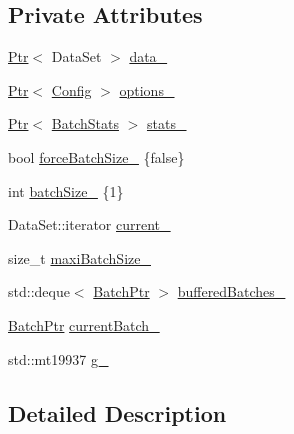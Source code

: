 \subsection*{Private Attributes}
\begin{DoxyCompactItemize}
\item 
\hyperlink{namespacemarian_ad1a373be43a00ef9ce35666145137b08}{Ptr}$<$ Data\+Set $>$ \hyperlink{classmarian_1_1data_1_1BatchGenerator_a1605c2a706f55cf89272cd19e2f98cf0}{data\+\_\+}
\item 
\hyperlink{namespacemarian_ad1a373be43a00ef9ce35666145137b08}{Ptr}$<$ \hyperlink{classmarian_1_1Config}{Config} $>$ \hyperlink{classmarian_1_1data_1_1BatchGenerator_a8569748b3bca0d5f30e6e2f4def1b535}{options\+\_\+}
\item 
\hyperlink{namespacemarian_ad1a373be43a00ef9ce35666145137b08}{Ptr}$<$ \hyperlink{classmarian_1_1data_1_1BatchStats}{Batch\+Stats} $>$ \hyperlink{classmarian_1_1data_1_1BatchGenerator_ac951bf49ac81aa01d834391dc1579096}{stats\+\_\+}
\item 
bool \hyperlink{classmarian_1_1data_1_1BatchGenerator_afde953e133498a8edcc993611299b135}{force\+Batch\+Size\+\_\+} \{false\}
\item 
int \hyperlink{classmarian_1_1data_1_1BatchGenerator_ae71699877e61295dbf3c4f544a1a73ea}{batch\+Size\+\_\+} \{1\}
\item 
Data\+Set\+::iterator \hyperlink{classmarian_1_1data_1_1BatchGenerator_ac6a705063c91ae12d09e8d40206c3dcf}{current\+\_\+}
\item 
size\+\_\+t \hyperlink{classmarian_1_1data_1_1BatchGenerator_a17267c3eaeaae25b4ac0c02a4308f9f8}{maxi\+Batch\+Size\+\_\+}
\item 
std\+::deque$<$ \hyperlink{classmarian_1_1data_1_1BatchGenerator_ae876f1ada46b7e7e3a4ea0ad45e9ee39}{Batch\+Ptr} $>$ \hyperlink{classmarian_1_1data_1_1BatchGenerator_a9e04fb7830ea05e42c0505d4f2077d70}{buffered\+Batches\+\_\+}
\item 
\hyperlink{classmarian_1_1data_1_1BatchGenerator_ae876f1ada46b7e7e3a4ea0ad45e9ee39}{Batch\+Ptr} \hyperlink{classmarian_1_1data_1_1BatchGenerator_a95d479771ef65874586e409599043711}{current\+Batch\+\_\+}
\item 
std\+::mt19937 \hyperlink{classmarian_1_1data_1_1BatchGenerator_a08b191a4be23424df9c45712f0410a32}{g\+\_\+}
\end{DoxyCompactItemize}


\subsection{Detailed Description}
